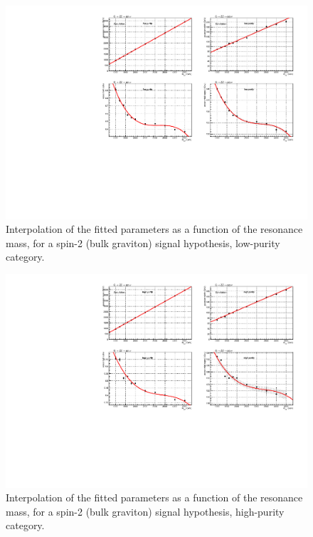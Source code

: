 \begin{figure}[!htb]
  \centering
    \includegraphics[width=.95\textwidth]{plotsAlpha_tesi/XVZnnlp/XZZInv_SignalShape.pdf}
  \caption{Interpolation of the fitted parameters as a function of the resonance mass, for a spin-2 (bulk graviton) signal hypothesis, low-purity category.}
  \label{fig:XZZ_SignalShapeLP}
\end{figure}

\begin{figure}[!htb]
  \centering
    \includegraphics[width=.95\textwidth]{plotsAlpha_tesi/XVZnnhp/XZZInv_SignalShape.pdf}

  \caption{Interpolation of the fitted parameters as a function of the resonance mass, for a spin-2 (bulk graviton) signal hypothesis, high-purity category.}
  \label{fig:XZZ_SignalShapeHP}
\end{figure}

